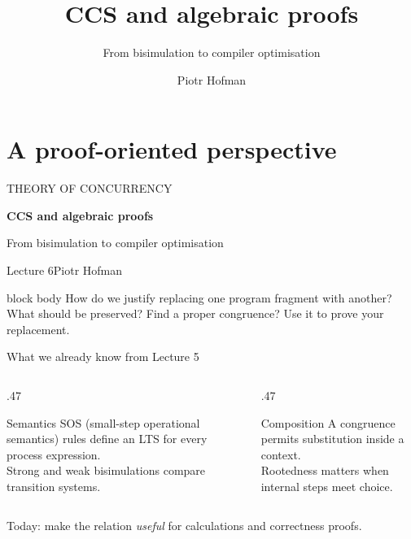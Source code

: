 \documentclass[handout,aspectratio=169,11pt]{beamer}
\title{CCS and algebraic proofs}
\subtitle{From bisimulation to compiler optimisation}
\author{Piotr Hofman}
\institute{Theory of Concurrency}
\date{}
\newcommand{\Takeaway}[1]{\begin{exampleblock}{}#1\end{exampleblock}}
\begin{document}
\section{A proof-oriented perspective}
\begin{frame}[plain]
  \vspace{9mm}
  {\color{Muted}\large THEORY OF CONCURRENCY\par}
  \vspace{6mm}
  {\color{Indigo}\LARGE\bfseries CCS and algebraic proofs\par}
  \vspace{3mm}
  {\Large From bisimulation to compiler optimisation\par}
  \vspace{8mm}
  {\large Lecture 6\quad\textcolor{Muted}{Piotr Hofman}\par}
  \vfill
  \begin{beamercolorbox}[sep=3mm,wd=\textwidth]{block body}
    How do we justify replacing one program fragment with another?\\[1mm]
    What should be preserved? Find a proper congruence? Use it to prove your replacement.
  \end{beamercolorbox}
  \vspace{3mm}
\end{frame}

\begin{frame}{What we already know from Lecture 5}
  \begin{columns}[T,onlytextwidth]
    \begin{column}{.47\textwidth}
      \begin{block}{Semantics}
        SOS (small-step operational semantics) rules define an LTS for every process expression.\\[2mm]
        Strong and weak bisimulations compare transition systems.
      \end{block}
    \end{column}
    \begin{column}{.47\textwidth}
      \begin{block}{Composition}
        A congruence permits substitution inside a context.\\[2mm]
        Rootedness matters when internal steps meet choice.
      \end{block}
    \end{column}
  \end{columns}
  \vspace{4mm}
  \Takeaway{Today: make the relation \emph{useful} for calculations and correctness proofs.}
\end{frame}
\end{document}
